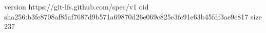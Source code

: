 version https://git-lfs.github.com/spec/v1
oid sha256:b3fe8708af85af7687d9b571a69870d26e069c825e3fc91e63b45fdf3ae9c817
size 237
